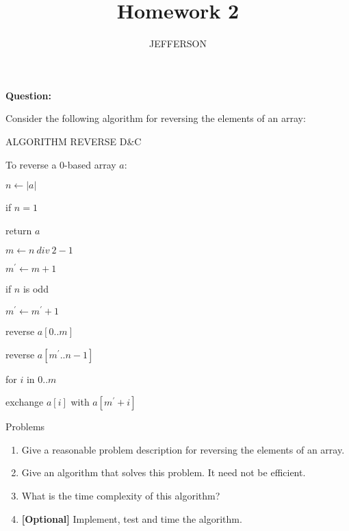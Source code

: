 \documentclass[11pt,letterpaper,oneside]{article}
\title{Homework 2}
\author{JEFFERSON}
\date{}
\begin{document}
\maketitle


\noindent\textbf{Question:}

Consider the following algorithm for reversing the elements of an array:

\vspace{1em}\hspace{2em} ALGORITHM REVERSE D\&C

\vspace{1em}\hspace{2em} To reverse a 0-based array $a$:

\hspace{3em}    $n \leftarrow |a|$

\hspace{3em}    if $n = 1$

\hspace{4em}        return $a$

\hspace{3em}    $m \leftarrow n\ div\ 2 - 1$

\hspace{3em}    $m^{\prime} \leftarrow m + 1$

\hspace{3em}    if $n$ is odd 

\hspace{4em}        $m^{\prime} \leftarrow m^{\prime} + 1$

\hspace{3em}    reverse $a[0..m]$

\hspace{3em}    reverse $a[m^{\prime}..n - 1]$

\hspace{3em}    for $i$ in $0..m$
 
\hspace{4em}        exchange $a[i]$ with $a[m^{\prime} + i]$

\null

\noindent Problems
\vspace{-1em}
\begin{enumerate}
  \itemsep1pt \parskip0pt 
  \item Give a reasonable problem description for reversing the elements of an array.
  \item Give an algorithm that solves this problem. It need not be efficient.
  \item What is the time complexity of this algorithm?
  \item \textbf{[Optional]} Implement, test and time the algorithm.
\end{enumerate}
\end{document}
